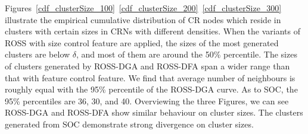 \documentclass[10pt,journal,compsoc]{IEEEtran}
\theoremstyle{mytheoremstyle}
\theoremstyle{mytheoremstyle}
\theoremstyle{mytheoremstyle}
\begin{document}
Figures~\ref{cdf_clusterSize_100}~\ref{cdf_clusterSize_200}~\ref{cdf_clusterSize_300} illustrate the empirical cumulative distribution of CR nodes which reside in clusters with certain sizes in CRNs with different densities.
When the variants of ROSS with size control feature are applied, the sizes of the most generated clusters are below $\delta$, and most of them are around the 50\% percentile.
The sizes of clusters generated by ROSS-DGA and ROSS-DFA span a wider range than that with feature control feature.
We find that average number of neighbours is roughly equal with the 95\% percentile of the ROSS-DGA curve.
As to SOC, the 95\% percentiles are 36, 30, and 40.
Overviewing the three Figures, we can see ROSS-DGA and ROSS-DFA show similar behaviour on cluster sizes.
The clusters generated from SOC demonstrate strong divergence on cluster sizes.
\end{document}
